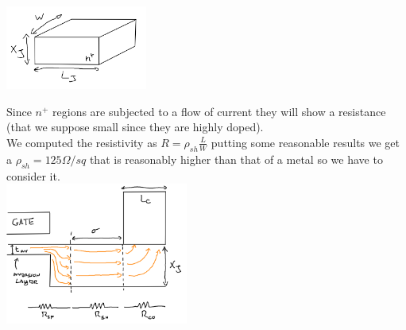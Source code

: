 \centering
\includegraphics[width=0.35\textwidth]{parasR1.png}\\
\raggedright

Since $n^+$ regions are subjected to a flow of current they will show a resistance (that we suppose small since they are highly doped).\\
We computed the resistivity as $R=\rho_{sh}\frac{L}{W}$ putting some reasonable results we get a $\rho_{sh}=125 \Omega/sq$ that is reasonably higher than that of a metal so we have to consider it.\\


\centering
\includegraphics[width=0.45\textwidth]{parasR2.png}\\
\raggedright


